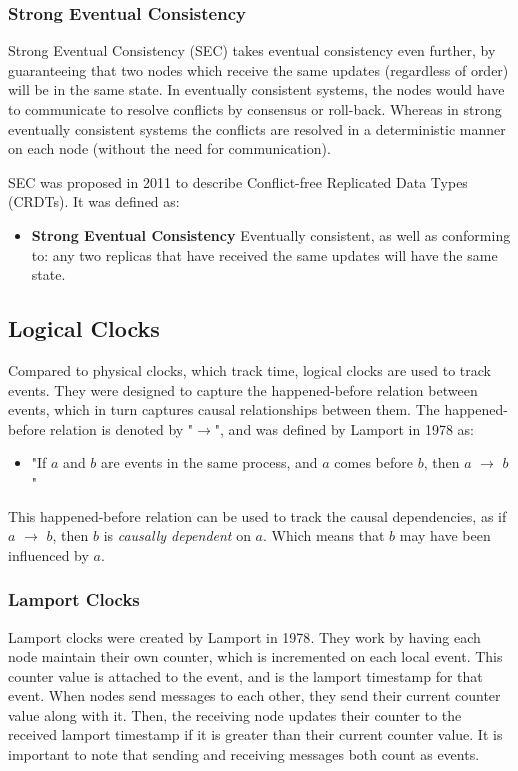 \documentclass[12pt]{article}
\begin{document}
\subsubsection{Strong Eventual Consistency}
Strong Eventual Consistency (SEC) takes eventual consistency even further, by guaranteeing that two nodes which receive the same updates (regardless of order) will be in the same state. In eventually consistent systems, the nodes would have to communicate to resolve conflicts by consensus or roll-back. Whereas in strong eventually consistent systems the conflicts are resolved in a deterministic manner on each node (without the need for communication). \par
SEC was proposed in 2011\cite{10.1007/978-3-642-24550-3_29} to describe Conflict-free Replicated Data Types (CRDTs). It was defined as:
\begin{itemize}
    \item \textbf{Strong Eventual Consistency} Eventually consistent, as well as conforming to: any two replicas that have received the same updates will have the same state.
\end{itemize}

\subsection{Logical Clocks}
Compared to physical clocks, which track time, logical clocks are used to track events. They were designed to capture the happened-before relation between events, which in turn captures causal relationships between them. The happened-before relation is denoted by "$\rightarrow$", and was defined by Lamport in 1978\cite{lamport1978time} as:
\begin{itemize}
    \item "If $a$ and $b$ are events in the same
    process, and $a$ comes before $b$, then $a$ $\rightarrow$ $b$"
\end{itemize}
This happened-before relation can be used to track the causal dependencies, as if $a$ $\rightarrow$ $b$, then $b$ is \textit{causally dependent} on $a$. Which means that $b$ may have been influenced by $a$. \par 
\subsubsection{Lamport Clocks}
Lamport clocks were created by Lamport in 1978\cite{lamport1978time}. They work by having each node maintain their own counter, which is incremented on each local event. This counter value is attached to the event, and is the lamport timestamp for that event. When nodes send messages to each other, they send their current counter value along with it. Then, the receiving node updates their counter to the received lamport timestamp if it is greater than their current counter value. It is important to note that sending and receiving messages both count as events. \par
\end{document}

